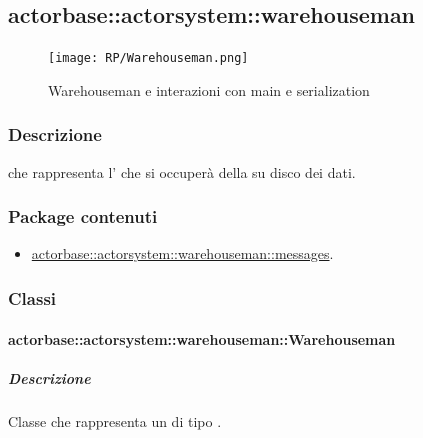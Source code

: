 \documentclass{scalatekids-article}
\begin{document}

\subsection{actorbase::actorsystem::warehouseman} %
\label{sec:actorbase::actorsystem::warehouseman}

\begin{figure}[H]
  \begin{center}
    \texttt{[image: RP/Warehouseman.png]}
    \caption{Warehouseman e interazioni con main e serialization}
  \end{center}
\end{figure}

\subsubsection{Descrizione}

 che rappresenta l' che si occuperà della
 su disco dei dati.

\subsubsection{Package contenuti}

\begin{itemize}

\item \hyperref[sec:actorbase::actorsystem::warehouseman::messages]{actorbase::actorsystem::warehouseman::messages}.

\end{itemize}

\subsubsection{Classi}

\paragraph{actorbase::actorsystem::warehouseman::Warehouseman}
\label{sec:actorbase::actorsystem::warehouseman::Warehouseman}

\subparagraph{Descrizione}

Classe che rappresenta un  di tipo .
\end{document}
